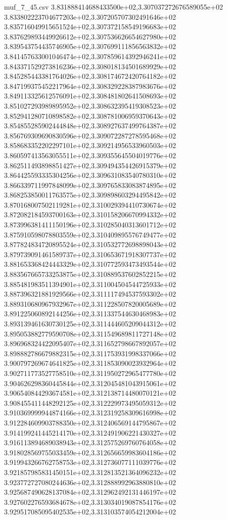 \begin{filecontents*}{muf_7_45.csv}
3.831888414688433500e+02,3.307037272676589055e+02
3.833802223704677203e+02,3.307205707302491646e+02
3.835716049915651524e+02,3.307372158549196683e+02
3.837629893449926612e+02,3.307536626654627980e+02
3.839543754435746905e+02,3.307699111856563832e+02
3.841457633001046474e+02,3.307859614392946241e+02
3.843371529273816236e+02,3.308018134501689929e+02
3.845285443381764026e+02,3.308174672420764182e+02
3.847199375452217964e+02,3.308329228387983676e+02
3.849113325612576091e+02,3.308481802641508693e+02
3.851027293989895952e+02,3.308632395419308523e+02
3.852941280710898582e+02,3.308781006959370643e+02
3.854855285902444848e+02,3.308927637499764387e+02
3.856769309690830596e+02,3.309072287278595468e+02
3.858683352202297101e+02,3.309214956533960503e+02
3.860597413563055511e+02,3.309355645504019776e+02
3.862511493898851427e+02,3.309494354426915379e+02
3.864425593335304256e+02,3.309631083540780310e+02
3.866339711997848099e+02,3.309765833083874895e+02
3.868253850011763575e+02,3.309898603294495842e+02
3.870168007502119281e+02,3.310029394410730674e+02
3.872082184593700163e+02,3.310158206670994332e+02
3.873996381411150196e+02,3.310285040313601712e+02
3.875910598078803559e+02,3.310409895576749477e+02
3.877824834720895524e+02,3.310532772698898043e+02
3.879739091461589737e+02,3.310653671918307737e+02
3.881653368424443329e+02,3.310772593473493544e+02
3.883567665733253875e+02,3.310889537602852215e+02
3.885481983511394901e+02,3.311004504544725933e+02
3.887396321881929566e+02,3.311117494537593302e+02
3.889310680967932967e+02,3.311228507820005689e+02
3.891225060892144256e+02,3.311337544630468983e+02
3.893139461630730125e+02,3.311444605209044312e+02
3.895053882779590708e+02,3.311549689811727148e+02
3.896968324422095407e+02,3.311652798667892057e+02
3.898882786679882315e+02,3.311753931998337066e+02
3.900797269674641825e+02,3.311853090023932964e+02
3.902711773527758510e+02,3.311950272965477780e+02
3.904626298360445844e+02,3.312045481043915061e+02
3.906540844293674581e+02,3.312138714480070121e+02
3.908455411448292125e+02,3.312229973495059312e+02
3.910369999944874166e+02,3.312319258309616998e+02
3.912284609903788350e+02,3.312406569144795867e+02
3.914199241445214170e+02,3.312491906221430327e+02
3.916113894689038943e+02,3.312575269760764058e+02
3.918028569755033459e+02,3.312656659983604186e+02
3.919943266762758753e+02,3.312736077111039776e+02
3.921857985831450151e+02,3.312813521364096232e+02
3.923772727080244636e+02,3.312888992963880810e+02
3.925687490628137084e+02,3.312962492131446197e+02
3.927602276593684678e+02,3.313034019087854176e+02
3.929517085095402535e+02,3.313103574054212004e+02

\end{filecontents*}
